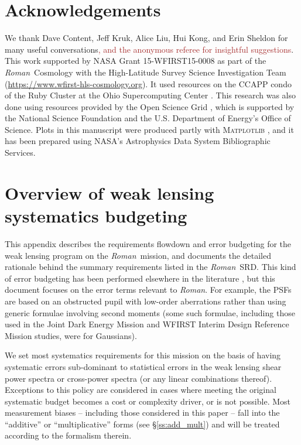 \documentclass[usenatbib]{mnras}
\newcommand{\wfirst}{{\slshape Roman}}
\newcommand{\changetext}[1]{\textcolor{brown}{#1}}
\begin{document}
\section*{Acknowledgements}

 We thank Dave Content, Jeff Kruk, Alice Liu, Hui Kong, and Erin Sheldon for many useful conversations\changetext{, and the anonymous referee for insightful suggestions}. 
This work supported by NASA Grant 15-WFIRST15-0008 as part of the \wfirst\ Cosmology with the High-Latitude Survey Science Investigation Team (\url{https://www.wfirst-hls-cosmology.org}). 
It used resources on the CCAPP condo of the Ruby Cluster at the Ohio Supercomputing Center \citep{OhioSupercomputerCenter1987}. This research was also done using resources provided by the Open Science Grid \citep{Pordes2008,Sfiligoi2009}, which is supported by the National Science Foundation and the U.S. Department of Energy's Office of Science. Plots in this manuscript were produced partly with \textsc{Matplotlib} \citep{Hunter:2007}, and it has been prepared using NASA's Astrophysics Data System Bibliographic Services.




\appendix

\section{Overview of weak lensing systematics budgeting}
\label{app:wl-budget}

This appendix describes the requirements flowdown and error budgeting
for the weak lensing program on the \wfirst\ mission, and documents the
detailed rationale behind the summary requirements listed in the
\wfirst\ SRD. This kind of error budgeting has been performed elsewhere
in the literature \citep{2008A&A...484...67P,2013MNRAS.429..661M}, but
this document focuses on the error terms relevant to \wfirst. For
example, the PSFs are based on an obstructed pupil with low-order
aberrations rather than using generic formulae involving second
moments (some such formulae, including those used in the Joint Dark Energy Mission and
WFIRST Interim Design Reference Mission studies, were for Gaussians).

We set most systematics requirements for this mission on the basis of
having systematic errors sub-dominant to statistical errors in the weak lensing
shear power spectra or cross-power spectra (or any linear combinations
thereof). Exceptions to this policy are considered in cases
where meeting the original systematic budget becomes a cost or
complexity driver, or is not possible. Most measurement biases -- including those considered in this paper -- fall
into the ``additive'' or ``multiplicative'' forms (see
\S\ref{ss:add_mult}) and will be treated according to the formalism
therein.
\end{document}
